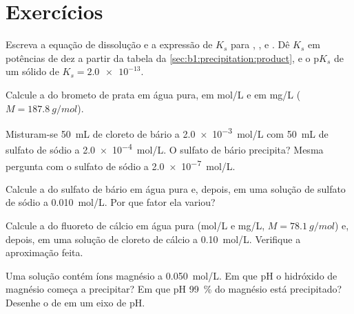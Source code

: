 \section{Exercícios}

\begin{exercise}[$\star$]\label{exo:b1:precipitation:1}
Escreva a equação de dissolução e a expressão de $K_s$ para
, ,  e . Dê $K_s$ em potências
de dez a partir da tabela da \cref{sec:b1:precipitation:product}, e o
$\mathrm{p}K_s$ de um sólido de $K_s = \num{2.0e-13}$.
\end{exercise}

\begin{exercise}[$\star$]\label{exo:b1:precipitation:2}
Calcule a  do brometo de prata em água pura, em \unit{mol/L}
e em \unit{mg/L} ($M = \qty{187.8}{g/mol}$).
\end{exercise}

\begin{exercise}[$\star$]\label{exo:b1:precipitation:3}
Misturam-se \qty{50}{mL} de cloreto de bário a \qty{2.0e-3}{mol/L} com
\qty{50}{mL} de sulfato de sódio a \qty{2.0e-4}{mol/L}. O sulfato de
bário precipita? Mesma pergunta com o sulfato de sódio a
\qty{2.0e-7}{mol/L}.
\end{exercise}

\begin{exercise}[$\star$]\label{exo:b1:precipitation:4}
Calcule a  do sulfato de bário em água pura e, depois, em uma
solução de sulfato de sódio a \qty{0.010}{mol/L}. Por que fator ela
variou?
\end{exercise}

\begin{exercise}[$\star\star$]\label{exo:b1:precipitation:5}
Calcule a  do fluoreto de cálcio em água pura (\unit{mol/L} e
\unit{mg/L}, $M = \qty{78.1}{g/mol}$) e, depois, em uma solução de cloreto
de cálcio a \qty{0.10}{mol/L}. Verifique a aproximação feita.
\end{exercise}

\begin{exercise}[$\star\star$]\label{exo:b1:precipitation:6}
Uma solução contém íons magnésio a \qty{0.050}{mol/L}. Em que pH o
hidróxido de magnésio começa a precipitar? Em que pH \qty{99}{\percent}
do magnésio está precipitado? Desenhe o  de
 em um eixo de pH.
\end{exercise}


